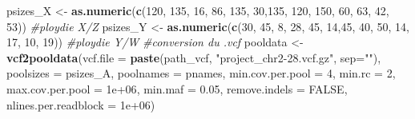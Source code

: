 \documentclass[
  openany]{book}
\newenvironment{Shaded}{\begin{snugshade}}{\end{snugshade}}
\newcommand{\AttributeTok}[1]{\textcolor[rgb]{0.13,0.29,0.53}{#1}}
\newcommand{\CommentTok}[1]{\textcolor[rgb]{0.56,0.35,0.01}{\textit{#1}}}
\newcommand{\ConstantTok}[1]{\textcolor[rgb]{0.56,0.35,0.01}{#1}}
\newcommand{\DecValTok}[1]{\textcolor[rgb]{0.00,0.00,0.81}{#1}}
\newcommand{\FloatTok}[1]{\textcolor[rgb]{0.00,0.00,0.81}{#1}}
\newcommand{\FunctionTok}[1]{\textcolor[rgb]{0.13,0.29,0.53}{\textbf{#1}}}
\newcommand{\NormalTok}[1]{#1}
\newcommand{\OtherTok}[1]{\textcolor[rgb]{0.56,0.35,0.01}{#1}}
\newcommand{\StringTok}[1]{\textcolor[rgb]{0.31,0.60,0.02}{#1}}
\theoremstyle{definition}
\theoremstyle{definition}
\theoremstyle{definition}
\theoremstyle{definition}
\theoremstyle{remark}
\begin{document}
\begin{Shaded}
\begin{Highlighting}[]
\NormalTok{psizes\_X }\OtherTok{\textless{}{-}} \FunctionTok{as.numeric}\NormalTok{(}\FunctionTok{c}\NormalTok{(}\StringTok{\textquotesingle{}120\textquotesingle{}}\NormalTok{, }\StringTok{\textquotesingle{}135\textquotesingle{}}\NormalTok{, }\StringTok{\textquotesingle{}16\textquotesingle{}}\NormalTok{, }\StringTok{\textquotesingle{}86\textquotesingle{}}\NormalTok{, }\StringTok{\textquotesingle{}135\textquotesingle{}}\NormalTok{, }\StringTok{\textquotesingle{}30\textquotesingle{}}\NormalTok{,}\StringTok{\textquotesingle{}135\textquotesingle{}}\NormalTok{, }\StringTok{\textquotesingle{}120\textquotesingle{}}\NormalTok{, }\StringTok{\textquotesingle{}150\textquotesingle{}}\NormalTok{, }\StringTok{\textquotesingle{}60\textquotesingle{}}\NormalTok{, }\StringTok{\textquotesingle{}63\textquotesingle{}}\NormalTok{, }\StringTok{\textquotesingle{}42\textquotesingle{}}\NormalTok{, }\StringTok{\textquotesingle{}53\textquotesingle{}}\NormalTok{))    }\CommentTok{\#ploydie X/Z}
\NormalTok{psizes\_Y }\OtherTok{\textless{}{-}} \FunctionTok{as.numeric}\NormalTok{(}\FunctionTok{c}\NormalTok{(}\StringTok{\textquotesingle{}30\textquotesingle{}}\NormalTok{, }\StringTok{\textquotesingle{}45\textquotesingle{}}\NormalTok{, }\StringTok{\textquotesingle{}8\textquotesingle{}}\NormalTok{, }\StringTok{\textquotesingle{}28\textquotesingle{}}\NormalTok{, }\StringTok{\textquotesingle{}45\textquotesingle{}}\NormalTok{, }\StringTok{\textquotesingle{}14\textquotesingle{}}\NormalTok{,}\StringTok{\textquotesingle{}45\textquotesingle{}}\NormalTok{, }\StringTok{\textquotesingle{}40\textquotesingle{}}\NormalTok{, }\StringTok{\textquotesingle{}50\textquotesingle{}}\NormalTok{, }\StringTok{\textquotesingle{}14\textquotesingle{}}\NormalTok{, }\StringTok{\textquotesingle{}17\textquotesingle{}}\NormalTok{, }\StringTok{\textquotesingle{}10\textquotesingle{}}\NormalTok{, }\StringTok{\textquotesingle{}19\textquotesingle{}}\NormalTok{))           }\CommentTok{\#ploydie Y/W}
\CommentTok{\#conversion du .vcf}
\NormalTok{pooldata }\OtherTok{\textless{}{-}} \FunctionTok{vcf2pooldata}\NormalTok{(}\AttributeTok{vcf.file =} \FunctionTok{paste}\NormalTok{(path\_vcf, }\StringTok{"project\_chr2{-}28.vcf.gz"}\NormalTok{, }\AttributeTok{sep=}\StringTok{""}\NormalTok{), }\AttributeTok{poolsizes =}\NormalTok{ psizes\_A, }\AttributeTok{poolnames =}\NormalTok{ pnames, }\AttributeTok{min.cov.per.pool =} \DecValTok{4}\NormalTok{, }\AttributeTok{min.rc =} \DecValTok{2}\NormalTok{, }\AttributeTok{max.cov.per.pool =} \FloatTok{1e+06}\NormalTok{, }\AttributeTok{min.maf =} \FloatTok{0.05}\NormalTok{, }\AttributeTok{remove.indels =} \ConstantTok{FALSE}\NormalTok{, }\AttributeTok{nlines.per.readblock =} \FloatTok{1e+06}\NormalTok{)}
\end{Highlighting}
\end{Shaded}
\end{document}
